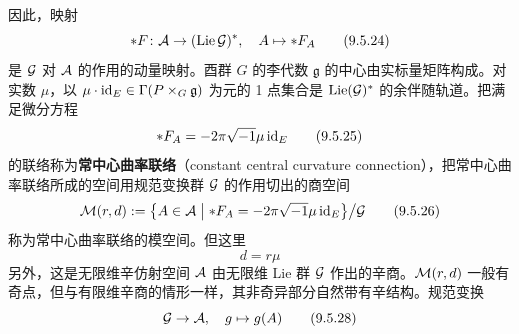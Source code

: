 
因此，映射
\begin{equation}
  *F\colon \mathcal{A} \to (\operatorname{Lie}\mathcal{G})^*,\quad A\mapsto *F_A
  \tag{9.5.24}
\end{equation}
是 $\mathcal{G}$ 对 $\mathcal{A}$ 的作用的动量映射。酉群 $G$ 的李代数 $\mathfrak{g}$ 的中心由实标量矩阵构成。对实数 $\mu$，以 $\mu\cdot \mathrm{id}_E\in\Gamma(P\times_G\mathfrak{g})$ 为元的 1 点集合是 $\operatorname{Lie}(\mathcal{G})^*$ 的余伴随轨道。把满足微分方程
\begin{equation}
  *F_A = -2\pi\sqrt{-1}\mu\,\mathrm{id}_E
  \tag{9.5.25}
\end{equation}
的联络称为\textbf{常中心曲率联络}（constant central curvature connection），把常中心曲率联络所成的空间用规范变换群 $\mathcal{G}$ 的作用切出的商空间
\begin{equation}
  \mathcal{M}(r,d) := \bigl\{A\in\mathcal{A} \bigm| *F_A = -2\pi\sqrt{-1}\mu\,\mathrm{id}_E\bigr\}\big/\mathcal{G}
  \tag{9.5.26}
\end{equation}
称为常中心曲率联络的模空间。但这里
\begin{equation}
  d = r\mu
  \tag{9.5.27}
\end{equation}
另外，这是无限维辛仿射空间 $\mathcal{A}$ 由无限维 Lie 群 $\mathcal{G}$ 作出的辛商。$\mathcal{M}(r,d)$ 一般有奇点，但与有限维辛商的情形一样，其非奇异部分自然带有辛结构。规范变换
\begin{equation}
  \mathcal{G}\to\mathcal{A},\quad g\mapsto g(A)
  \tag{9.5.28}
\end{equation}

